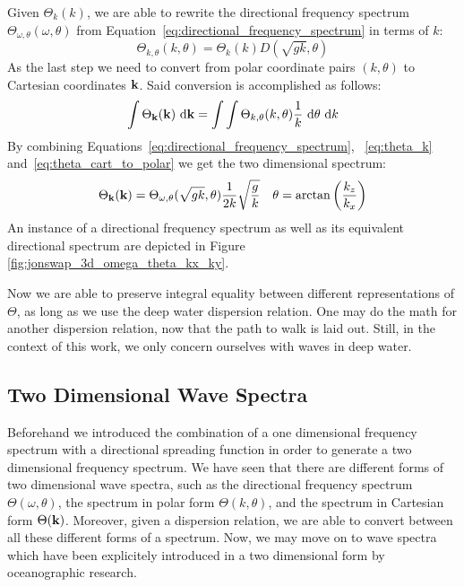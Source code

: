 Given $\Theta_k(k)$, we are able to rewrite the directional frequency spectrum
$\Theta_{\omega, \theta}(\omega, \theta)$ from
Equation~\ref{eq:directional_frequency_spectrum} in terms of \wavenumber $k$:
%
\begin{equation}
\label{eq:theta_k_polar}
 \Theta_{k,\theta}(k,\theta) = \Theta_k(k)D(\sqrt{gk},\theta)
\end{equation}
%
As the last step we need to convert from polar coordinate pairs 
$(k,\theta)$ to Cartesian \wavenumber coordinates $\mathbf{k}$. Said conversion 
is accomplished as follows:
%
\begin{equation}
\label{eq:theta_cart_to_polar}
\int\Theta_{\mathbf{k}}(\mathbf{k})~\mathrm{d}\mathbf{k} = 
\int\int\Theta_{k,\theta}(k,\theta)\frac{1}{k}~\mathrm{d}\theta~\mathrm{d}k
\end{equation}
%
By combining Equations~\ref{eq:directional_frequency_spectrum}, 
~\ref{eq:theta_k} and~\ref{eq:theta_cart_to_polar} we get the two dimensional
\wavenumber spectrum:
%
\begin{align}
\Theta_{\mathbf{k}}(\mathbf{k}) = \Theta_{\omega,\theta}(\sqrt{gk}, 
\theta)\frac{1}{2k}\sqrt{\frac{g}{k}} &&
\theta = \arctan\left(\frac{k_z}{k_x}\right)
\end{align}
%
An instance of a directional frequency spectrum as well as its equivalent
directional \wavenumber spectrum are depicted in Figure
\ref{fig:jonswap_3d_omega_theta_kx_ky}.

Now we are able to preserve integral equality between different representations 
of $\Theta$, as long as we use the deep water dispersion relation. One may do 
the math for another dispersion relation, now that the path to walk is laid 
out. Still, in the context of this work, we only concern ourselves with waves 
in deep water.
%
\subsection{Two Dimensional Wave Spectra}
%
Beforehand we introduced the combination of a one dimensional 
frequency spectrum with a directional spreading function in order to generate a 
two dimensional frequency spectrum. We have seen that there are different forms
of two dimensional wave spectra, such as the directional frequency spectrum
$\Theta(\omega, \theta)$, the \wavenumber spectrum in polar form
$\Theta(k, \theta)$, and the \wavenumber spectrum in Cartesian form
$\Theta(\mathbf{k})$. Moreover, given a dispersion relation, we 
are able to convert between all these different forms of a spectrum. Now, we 
may move on to wave spectra which have been explicitely introduced in a two 
dimensional form by oceanographic research.

